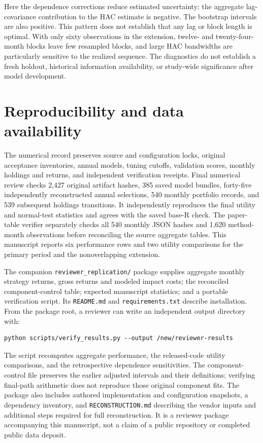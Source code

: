 \documentclass[12pt,letterpaper,fleqn]{article}
\begin{document}
Here the dependence corrections reduce estimated uncertainty: the aggregate lag-covariance contribution to the HAC estimate is negative. The bootstrap intervals are also positive. This pattern does not establish that any lag or block length is optimal. With only sixty observations in the extension, twelve- and twenty-four-month blocks leave few resampled blocks, and large HAC bandwidths are particularly sensitive to the realized sequence. The diagnostics do not establish a fresh holdout, historical information availability, or study-wide significance after model development.

\FloatBarrier
\section{Reproducibility and data availability}\label{app:reproduce}
The numerical record preserves source and configuration locks, original acceptance inventories, annual models, tuning cutoffs, validation scores, monthly holdings and returns, and independent verification receipts. Final numerical review checks 2,427 original artifact hashes, 385 saved model bundles, forty-five independently reconstructed annual selections, 540 monthly portfolio records, and 539 subsequent holdings transitions. It independently reproduces the final utility and normal-test statistics and agrees with the saved base-R check. The paper-table verifier separately checks all 540 monthly JSON hashes and 1,620 method-month observations before reconciling the source aggregate tables. This manuscript reports six performance rows and two utility comparisons for the primary period and the nonoverlapping extension.

The companion \texttt{reviewer\_replication/} package supplies aggregate monthly strategy returns, gross returns and modeled impact costs; the reconciled component-control table; expected manuscript statistics; and a portable verification script. Its \texttt{README.md} and \texttt{requirements.txt} describe installation. From the package root, a reviewer can write an independent output directory with:

\par\noindent\begin{minipage}{\linewidth}\footnotesize
\begin{verbatim}
python scripts/verify_results.py --output /new/reviewer-results
\end{verbatim}
\end{minipage}\par
The script recomputes aggregate performance, the released-code utility comparisons, and the retrospective dependence sensitivities. The component-control file preserves the earlier adjusted intervals and their definitions; verifying final-path arithmetic does not reproduce those original component fits. The package also includes authored implementation and configuration snapshots, a dependency inventory, and \texttt{RECONSTRUCTION.md} describing the vendor inputs and additional steps required for full reconstruction. It is a reviewer package accompanying this manuscript, not a claim of a public repository or completed public data deposit.
\end{document}

